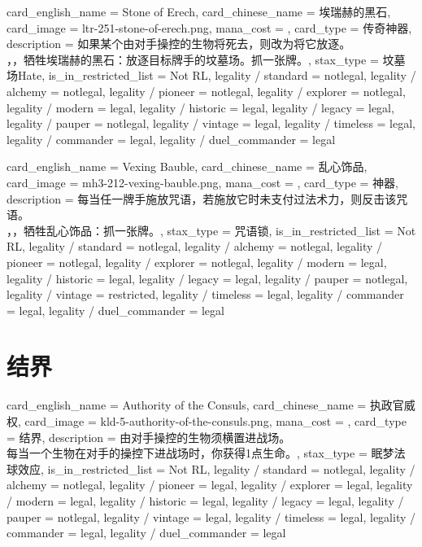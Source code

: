 \documentclass[lang = cn, color = black, 10pt]{AllThatStax}
\begin{document}
\card
{
	card_english_name = {Stone of Erech},
	card_chinese_name = {埃瑞赫的黑石},
	card_image = ltr-251-stone-of-erech.png,
	mana_cost = ,
	card_type = 传奇神器,
	description = {如果某个由对手操控的生物将死去，则改为将它放逐。\\
，，牺牲埃瑞赫的黑石：放逐目标牌手的坟墓场。抓一张牌。},
	stax_type = 坟墓场Hate,
	is_in_restricted_list = Not RL,
	legality / standard = notlegal,
	legality / alchemy = notlegal,
	legality / pioneer = notlegal,
	legality / explorer = notlegal,
	legality / modern = legal,
	legality / historic = legal,
	legality / legacy = legal,
	legality / pauper = notlegal,
	legality / vintage = legal,
	legality / timeless = legal,
	legality / commander = legal,
	legality / duel_commander = legal
}

\card
{
	card_english_name = {Vexing Bauble},
	card_chinese_name = {乱心饰品},
	card_image = mh3-212-vexing-bauble.png,
	mana_cost = ,
	card_type = 神器,
	description = {每当任一牌手施放咒语，若施放它时未支付过法术力，则反击该咒语。\\
，，牺牲乱心饰品：抓一张牌。},
	stax_type = 咒语锁,
	is_in_restricted_list = Not RL,
	legality / standard = notlegal,
	legality / alchemy = notlegal,
	legality / pioneer = notlegal,
	legality / explorer = notlegal,
	legality / modern = legal,
	legality / historic = legal,
	legality / legacy = legal,
	legality / pauper = notlegal,
	legality / vintage = restricted,
	legality / timeless = legal,
	legality / commander = legal,
	legality / duel_commander = legal
}

\section{结界}

\card
{
	card_english_name = {Authority of the Consuls},
	card_chinese_name = {执政官威权},
	card_image = kld-5-authority-of-the-consuls.png,
	mana_cost = ,
	card_type = 结界,
	description = {由对手操控的生物须横置进战场。\\
每当一个生物在对手的操控下进战场时，你获得1点生命。},
	stax_type = 眠梦法球效应,
	is_in_restricted_list = Not RL,
	legality / standard = notlegal,
	legality / alchemy = notlegal,
	legality / pioneer = legal,
	legality / explorer = legal,
	legality / modern = legal,
	legality / historic = legal,
	legality / legacy = legal,
	legality / pauper = notlegal,
	legality / vintage = legal,
	legality / timeless = legal,
	legality / commander = legal,
	legality / duel_commander = legal
}
\end{document}
